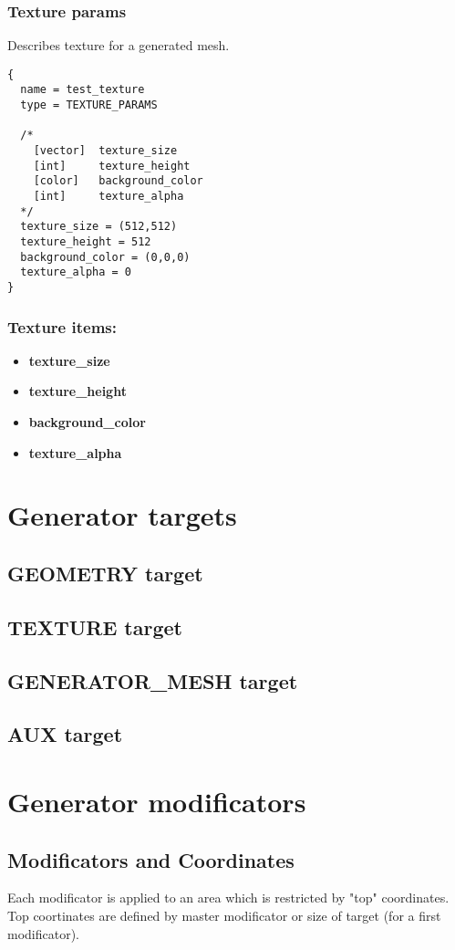 \documentclass[9pt]{article}
\begin{document}
\subsubsection{Texture params}
Describes texture for a generated mesh.
\begin{verbatim}
{
  name = test_texture
  type = TEXTURE_PARAMS

  /*
    [vector]  texture_size
    [int]     texture_height
    [color]   background_color
    [int]     texture_alpha
  */
  texture_size = (512,512)  
  texture_height = 512
  background_color = (0,0,0)
  texture_alpha = 0
}
\end{verbatim}
\subsubsection*{Texture items:}
\begin{itemize}
\item{\bf texture\_size}
\item{\bf texture\_height}
\item{\bf background\_color}
\item{\bf texture\_alpha}
\end{itemize}

\section{Generator targets}
\subsection{GEOMETRY target}
\subsection{TEXTURE target}
\subsection{GENERATOR\_MESH target}
\subsection{AUX target}

\section{Generator modificators}

\subsection{Modificators and Coordinates}
Each modificator is applied to an area which is restricted by "top" coordinates. 
Top coortinates are defined by master modificator or size of target 
(for a first modificator).
\end{document}
